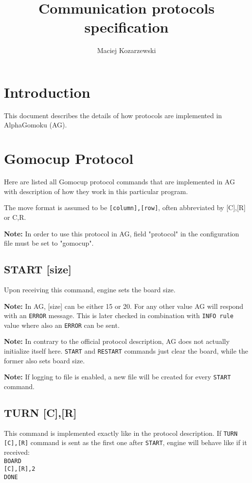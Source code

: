 \documentclass[12pt,a4paper]{article}
\title{Communication protocols specification}
\author{Maciej Kozarzewski}
\date{ }
\begin{document}
\maketitle

\tableofcontents

\section{Introduction}
This document describes the details of how protocols are implemented in AlphaGomoku (AG).


\newpage
\section{Gomocup Protocol}
Here are listed all Gomocup protocol \cite{newprotocol} commands that are implemented in AG with description of how they work in this particular program.

The move format is assumed to be \texttt{[column],[row]}, often abbreviated by [C],[R] or C,R.

\textbf{Note:} In order to use this protocol in AG, field "protocol" in the configuration file must be set to "gomocup".

\subsection{START [size]}
\label{cmd_start}
Upon receiving this command, engine sets the board size.

\textbf{Note:} In AG, [size] can be either 15 or 20. For any other value AG will respond with an \texttt{ERROR} message. This is later checked in combination with \texttt{INFO rule} value where also an \texttt{ERROR} can be sent.

\textbf{Note:} In contrary to the official protocol description, AG does not actually initialize itself here. \texttt{START} and \texttt{RESTART} commands just clear the board, while the former also sets board size.

\textbf{Note:} If logging to file is enabled, a new file will be created for every \texttt{START} command.


\subsection{TURN [C],[R]}
\label{cmd_turn}
This command is implemented exactly like in the protocol description. If \texttt{TURN [C],[R]} command is sent as the first one after \texttt{START}, engine will behave like if it received:\\
\texttt{BOARD} \\
\texttt{[C],[R],2} \\
\texttt{DONE}\\
\end{document}
